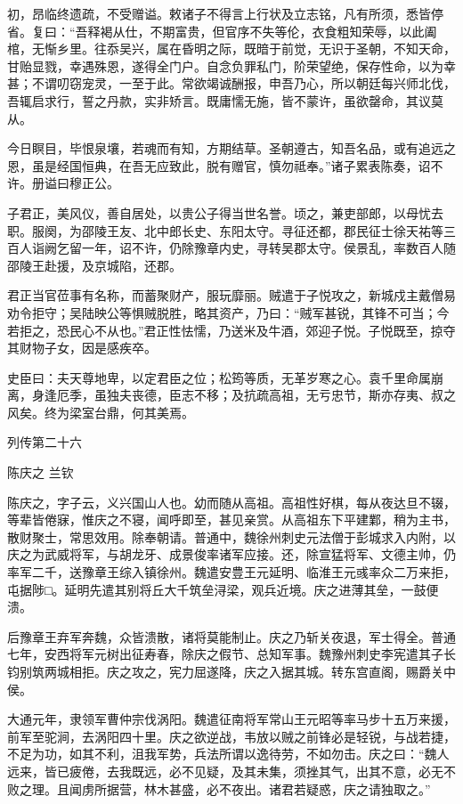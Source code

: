 \documentclass[12pt,UTF8]{ctexbook}
\begin{document}
初，昂临终遗疏，不受赠谥。敕诸子不得言上行状及立志铭，凡有所须，悉皆停省。复曰：“吾释褐从仕，不期富贵，但官序不失等伦，衣食粗知荣辱，以此阖棺，无惭乡里。往忝吴兴，属在昏明之际，既暗于前觉，无识于圣朝，不知天命，甘贻显戮，幸遇殊恩，遂得全门户。自念负罪私门，阶荣望绝，保存性命，以为幸甚；不谓叨窃宠灵，一至于此。常欲竭诚酬报，申吾乃心，所以朝廷每兴师北伐，吾辄启求行，誓之丹款，实非矫言。既庸懦无施，皆不蒙许，虽欲罄命，其议莫从。

今日瞑目，毕恨泉壤，若魂而有知，方期结草。圣朝遵古，知吾名品，或有追远之恩，虽是经国恒典，在吾无应致此，脱有赠官，慎勿祗奉。”诸子累表陈奏，诏不许。册谥曰穆正公。

子君正，美风仪，善自居处，以贵公子得当世名誉。顷之，兼吏部郎，以母忧去职。服阕，为邵陵王友、北中郎长史、东阳太守。寻征还都，郡民征士徐天祐等三百人诣阙乞留一年，诏不许，仍除豫章内史，寻转吴郡太守。侯景乱，率数百人随邵陵王赴援，及京城陷，还郡。

君正当官莅事有名称，而蓄聚财产，服玩靡丽。贼遣于子悦攻之，新城戍主戴僧易劝令拒守；吴陆映公等惧贼脱胜，略其资产，乃曰：“贼军甚锐，其锋不可当；今若拒之，恐民心不从也。”君正性怯懦，乃送米及牛酒，郊迎子悦。子悦既至，掠夺其财物子女，因是感疾卒。

史臣曰：夫天尊地卑，以定君臣之位；松筠等质，无革岁寒之心。袁千里命属崩离，身逢厄季，虽独夫丧德，臣志不移；及抗疏高祖，无亏忠节，斯亦存夷、叔之风矣。终为梁室台鼎，何其美焉。





列传第二十六

陈庆之 兰钦

陈庆之，字子云，义兴国山人也。幼而随从高祖。高祖性好棋，每从夜达旦不辍，等辈皆倦寐，惟庆之不寝，闻呼即至，甚见亲赏。从高祖东下平建鄴，稍为主书，散财聚士，常思效用。除奉朝请。普通中，魏徐州刺史元法僧于彭城求入内附，以庆之为武威将军，与胡龙牙、成景俊率诸军应接。还，除宣猛将军、文德主帅，仍率军二千，送豫章王综入镇徐州。魏遣安豊王元延明、临淮王元彧率众二万来拒，屯据陟□。延明先遣其别将丘大千筑垒浔梁，观兵近境。庆之进薄其垒，一鼓便溃。

后豫章王弃军奔魏，众皆溃散，诸将莫能制止。庆之乃斩关夜退，军士得全。普通七年，安西将军元树出征寿春，除庆之假节、总知军事。魏豫州刺史李宪遣其子长钧别筑两城相拒。庆之攻之，宪力屈遂降，庆之入据其城。转东宫直阁，赐爵关中侯。

大通元年，隶领军曹仲宗伐涡阳。魏遣征南将军常山王元昭等率马步十五万来援，前军至驼涧，去涡阳四十里。庆之欲逆战，韦放以贼之前锋必是轻锐，与战若捷，不足为功，如其不利，沮我军势，兵法所谓以逸待劳，不如勿击。庆之曰：“魏人远来，皆已疲倦，去我既远，必不见疑，及其未集，须挫其气，出其不意，必无不败之理。且闻虏所据营，林木甚盛，必不夜出。诸君若疑惑，庆之请独取之。”
\end{document}
